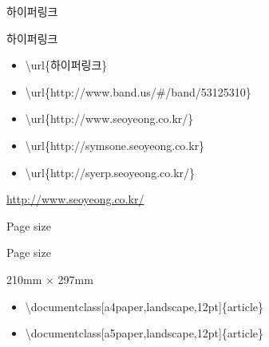 \documentclass[ aspectratio=149,  14pt,blue,xcolor=pdftex,dvipsnames,table,handout,notes]{beamer}
\begin{document}

		\begin{frame}[t]{하이퍼링크}

			\begin{block} {하이퍼링크}
				\begin{itemize}
				\item [] \textbackslash  url\{하이퍼링크\}																\end{itemize}
			\end{block}

			\begin{example}
				\begin{itemize}
				\item \textbackslash url\{http://www.band.us/\#/band/53125310\} 
				\item \textbackslash url\{http://www.seoyeong.co.kr/\}
				\item \textbackslash url\{http://symsone.seoyeong.co.kr\}
				\item \textbackslash url\{http://syerp.seoyeong.co.kr/\}						
				\end{itemize}
			\end{example}

				\url{http://www.seoyeong.co.kr/}

		\end{frame}





		\begin{frame}[c]{Page size}


			\begin{block} {Page size}
			\begin{description}[12345678901234567890]
			\item	[a4paper] 210mm $\times$ 297mm
			\item	[a5paper]
			\item	[b5paper]
			\item	[letterpaper]
			\item	[legalpaper]
			\item	[executivepaper]
			\end{description}
			\end{block}


			\begin{example}
			\begin{itemize}
			\item[]	\textbackslash documentclass[a4paper,landscape,12pt]\{article\}
			\item[]	\textbackslash documentclass[a5paper,landscape,12pt]\{article\}
			\end{itemize}
			\end{example}


		\end{frame}
\end{document}
